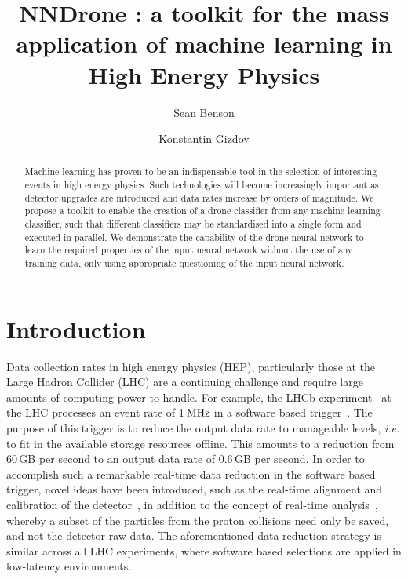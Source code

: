 \documentclass[final,5p,times,twocolumn]{elsarticle}
\def\lhcb {\mbox{LHCb}\xspace}
\def\mhz  {\ensuremath{{\rm \,MHz}}\xspace}
\newcommand{\ie}{\mbox{\itshape i.e.}\xspace}
\begin{document}

\begin{frontmatter}
\author[nl]{Sean Benson}
\author[uoe]{Konstantin Gizdov}
\address[nl]{Nikhef National Institute for Subatomic Physics, Amsterdam, The Netherlands}
\address[uoe]{School of Physics and Astronomy, University of Edinburgh, Edinburgh, United Kingdom}
\title{NNDrone : a toolkit for the mass application of machine learning in High Energy Physics}
\begin{abstract}
  \noindent
  Machine learning has proven to be an indispensable tool in the selection of
  interesting events in high energy physics. Such technologies will become increasingly
  important as detector upgrades are introduced and data rates increase by orders of magnitude.
  We propose a toolkit to enable the creation of a drone classifier from any machine learning
  classifier, such that different classifiers may be standardised into a single form and executed
  in parallel. We demonstrate the capability of the drone neural network 
  to learn the required properties of the input neural network without
  the use of any training data, only using appropriate questioning of the input neural network.
\end{abstract}
\end{frontmatter}

\section{Introduction}
\label{sec:intro}

Data collection rates in high energy physics (HEP), particularly those at the Large Hadron Collider (LHC)
are a continuing challenge and require large amounts of computing power to handle.
For example, the \lhcb experiment~\cite{Alves:2008zz} at the LHC processes an event rate of 1\mhz in a software
based trigger~\cite{LHCb-DP-2014-002}. The purpose of this trigger is to reduce the output
data rate to manageable levels, \ie to fit in the available storage resources offline.
This amounts to a reduction from 60\,GB per second to an output data rate of 0.6\,GB per second. 
In order to accomplish such a remarkable real-time data reduction in the software based trigger,
novel ideas have been introduced, such as the real-time alignment and calibration of the detector~\cite{Xu:2016mik},
in addition to the concept of real-time analysis~\cite{Aaij:2016rxn}, whereby a subset of the particles from the proton collisions need only
be saved, and not the detector raw data.
The aforementioned data-reduction strategy is similar across all LHC experiments, where
software based selections are applied in low-latency environments.
\end{document}
